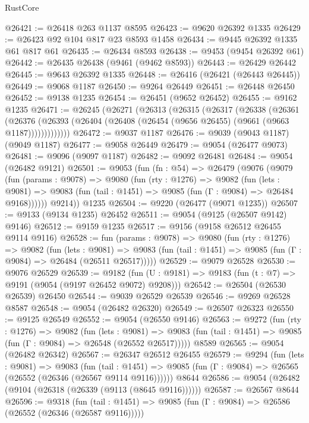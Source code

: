 \begin{lexlean}{RustCore}
\begin{coremodule}
@26421 := @26418 @263 @1137 @8595
@26423 := @9620 @26392 @1335
@26429 := @26423 @92 @104 @817 @23 @8593 @1458
@26434 := @9445 @26392 @1335 @61 @817 @61
@26435 := @26434 @8593
@26438 := @9453 (@9454 @26392 @61)
@26442 := @26435 @26438 (@9461 (@9462 @8593))
@26443 := @26429 @26442
@26445 := @9643 @26392 @1335
@26448 := @26416 (@26421 (@26443 @26445))
@26449 := @9068 @1187
@26450 := @9264 @26449
@26451 := @26448 @26450
@26452 := @9138 @1235
@26454 := @26451 (@9652 @26452)
@26455 := @9162 @1235
@26471 := @26245
    (@26271
      (@26313
        (@26315
          (@26317
            (@26338
              (@26361
                (@26376
                  (@26393 (@26404 (@26408 (@26454 (@9656 @26455) (@9661 (@9663 @1187)))))))))))))
@26472 := @9037 @1187
@26476 := @9039 (@9043 @1187) (@9049 @1187)
@26477 := @9058 @26449
@26479 := @9054 (@26477 @9073)
@26481 := @9096 (@9097 @1187)
@26482 := @9092 @26481
@26484 := @9054 (@26482 @9121)
@26501 := @9053
    (fun (fn : @54) =>
    @26479
      (@9076
        (@9079
          (fun (params : @9078) =>
          @9080
            (fun (rty : @1276) =>
            @9082
              (fun (lets : @9081) =>
              @9083 (fun (tail : @1451) => @9085 (fun (Γ : @9084) => @26484 @9168))))))
        @9214))
    @1235
@26504 := @9220 (@26477 (@9071 @1235))
@26507 := @9133 (@9134 @1235) @26452
@26511 := @9054 (@9125 (@26507 @9142) @9146)
@26512 := @9159 @1235
@26517 := @9156 (@9158 @26512 @26455 @9114 @9116)
@26528 := fun (params : @9078) =>
  @9080
    (fun (rty : @1276) =>
    @9082
      (fun (lets : @9081) =>
      @9083 (fun (tail : @1451) => @9085 (fun (Γ : @9084) => @26484 (@26511 @26517)))))
@26529 := @9079 @26528
@26530 := @9076 @26529
@26539 := @9182
    (fun (U : @9181) => @9183 (fun (t : @7) => @9191 (@9054 (@9197 @26452 @9072) @9208)))
@26542 := @26504 (@26530 @26539) @26450
@26544 := @9039 @26529 @26539
@26546 := @9269 @26528 @8587
@26548 := @9054 (@26482 @26320)
@26549 := @26507 @26323
@26550 := @9125 @26549
@26552 := @9054 (@26550 @9146)
@26563 := @9272
    (fun (rty : @1276) =>
    @9082
      (fun (lets : @9081) =>
      @9083 (fun (tail : @1451) => @9085 (fun (Γ : @9084) => @26548 (@26552 @26517)))))
    @8589
@26565 := @9054 (@26482 @26342)
@26567 := @26347 @26512 @26455
@26579 := @9294
    (fun (lets : @9081) =>
    @9083
      (fun (tail : @1451) =>
      @9085 (fun (Γ : @9084) => @26565 (@26552 (@26346 (@26567 @9114 @9116))))))
    @8644
@26586 := @9054 (@26482 (@9104 (@26318 (@26339 (@9113 (@8645 @9116))))))
@26587 := @26567 @8644
@26596 := @9318
    (fun (tail : @1451) => @9085 (fun (Γ : @9084) => @26586 (@26552 (@26346 (@26587 @9116)))))

\end{coremodule}
\end{lexlean}
